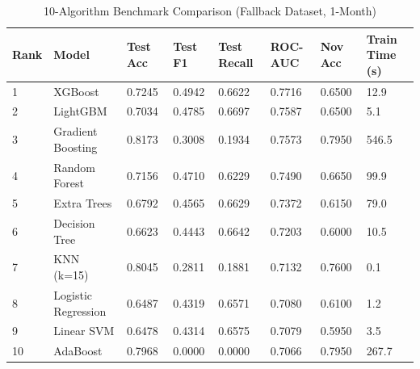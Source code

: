 \begin{table}[ht]
\centering
\caption{10-Algorithm Benchmark Comparison (Fallback Dataset, 1-Month)}
\label{tab:algos}
\begin{tabular}{llllllll}
\hline
Rank & Model & Test Acc & Test F1 & Test Recall & ROC-AUC & Nov Acc & Train Time (s) \\
\hline
1 & XGBoost & 0.7245 & 0.4942 & 0.6622 & 0.7716 & 0.6500 & 12.9 \\
2 & LightGBM & 0.7034 & 0.4785 & 0.6697 & 0.7587 & 0.6500 & 5.1 \\
3 & Gradient Boosting & 0.8173 & 0.3008 & 0.1934 & 0.7573 & 0.7950 & 546.5 \\
4 & Random Forest & 0.7156 & 0.4710 & 0.6229 & 0.7490 & 0.6650 & 99.9 \\
5 & Extra Trees & 0.6792 & 0.4565 & 0.6629 & 0.7372 & 0.6150 & 79.0 \\
6 & Decision Tree & 0.6623 & 0.4443 & 0.6642 & 0.7203 & 0.6000 & 10.5 \\
7 & KNN (k=15) & 0.8045 & 0.2811 & 0.1881 & 0.7132 & 0.7600 & 0.1 \\
8 & Logistic Regression & 0.6487 & 0.4319 & 0.6571 & 0.7080 & 0.6100 & 1.2 \\
9 & Linear SVM & 0.6478 & 0.4314 & 0.6575 & 0.7079 & 0.5950 & 3.5 \\
10 & AdaBoost & 0.7968 & 0.0000 & 0.0000 & 0.7066 & 0.7950 & 267.7 \\
\hline
\end{tabular}
\end{table}